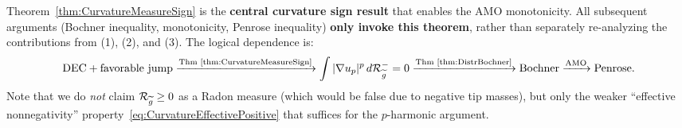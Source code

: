 \begin{remark}
Theorem~\ref{thm:CurvatureMeasureSign} is the \textbf{central curvature sign result} that enables the AMO monotonicity. All subsequent arguments (Bochner inequality, monotonicity, Penrose inequality) \textbf{only invoke this theorem}, rather than separately re-analyzing the contributions from (1), (2), and (3). The logical dependence is:
\[
\text{DEC} + \text{favorable jump} \xrightarrow{\text{Thm~\ref{thm:CurvatureMeasureSign}}} \int |\nabla u_p|^p \, d\mathcal{R}_{\widetilde{g}}^- = 0 \xrightarrow{\text{Thm~\ref{thm:DistrBochner}}} \text{Bochner} \xrightarrow{\text{AMO}} \text{Penrose}.
\]
Note that we do \emph{not} claim $\mathcal{R}_{\widetilde{g}} \ge 0$ as a Radon measure (which would be false due to negative tip masses), but only the weaker ``effective nonnegativity'' property~\eqref{eq:CurvatureEffectivePositive} that suffices for the $p$-harmonic argument.
\end{remark}

